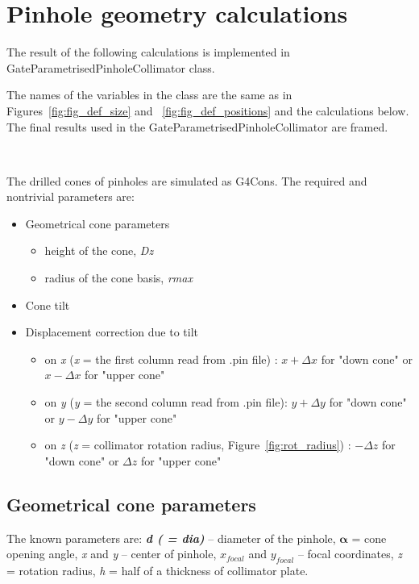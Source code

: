 \documentclass[12pt]{article}
\begin{document}
\clearpage
\section{Pinhole geometry calculations}
The result of the following calculations is implemented in GateParametrisedPinholeCollimator class.

The names of the variables in the class are the same as in Figures~\ref{fig:fig_def_size} and ~\ref{fig:fig_def_positions} and the calculations below. The final results used in the GateParametrisedPinholeCollimator are framed.

\

The drilled cones of pinholes are simulated as G4Cons. The required and nontrivial parameters are: 
\begin{itemize}
\item Geometrical cone parameters
	\begin{itemize}
	\item height of the cone, \textit{Dz} 
	\item radius of the cone basis, \textit{rmax}
	\end{itemize}	
\item Cone tilt 
\item Displacement correction due to tilt
	\begin{itemize}
	\item  on \textit{x} (\textit{x} = the first column read from .pin file) : $x+\Delta x$ for "down cone" or $x-\Delta x$ for "upper cone"
	\item on \textit{y} (\textit{y} = the second column read from .pin file): $y+\Delta y$ for "down cone" or $y-\Delta y$ for "upper cone"
	\item on \textit{z} (\textit{z} = collimator rotation radius, Figure~\ref{fig:rot_radius}) : $-\Delta z$ for "down cone" or $\Delta z$ for "upper cone" 
	\end{itemize}	
\end{itemize}


\subsection{Geometrical cone parameters}

The known parameters are: \textbf{\textit{d ( = dia)}} -- diameter of the pinhole, $\mathbf{\alpha}$ = cone opening angle, \textit{x} and \textit{y} -- center of pinhole, $x_{focal}$ and $y_{focal}$ -- focal coordinates, \textit{z} = rotation radius, \textit{h} = half of a thickness of collimator plate.
\end{document}
